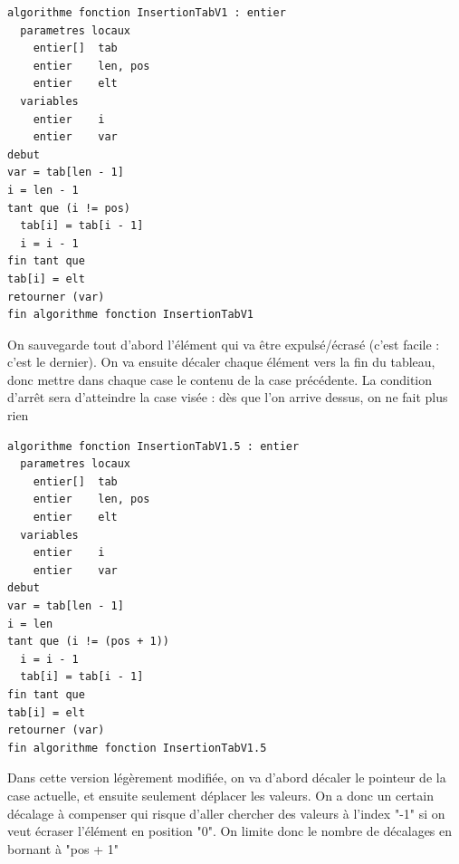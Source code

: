 \documentclass[11pt,a4paper]{article}
\begin{document}
\begin{table}[ht!]
  \centering
\begin{lstlisting}[style=algorithmique]
algorithme fonction InsertionTabV1 : entier
  parametres locaux
    entier[]  tab
    entier    len, pos
    entier    elt
  variables
    entier    i
    entier    var
debut
var = tab[len - 1]
i = len - 1
tant que (i != pos)
  tab[i] = tab[i - 1]
  i = i - 1
fin tant que
tab[i] = elt
retourner (var)
fin algorithme fonction InsertionTabV1 \end{lstlisting}
  \caption{On sauvegarde tout d'abord l'élément qui va être expulsé/écrasé (c'est facile : c'est le dernier). On va ensuite décaler chaque élément vers la fin du tableau, donc mettre dans chaque case le contenu de la case précédente. La condition d'arrêt sera d'atteindre la case visée : dès que l'on arrive dessus, on ne fait plus rien }
\end{table}

\vfillLast

\newpage

\vfillFirst

\begin{table}[ht!]
  \centering
\begin{lstlisting}[style=algorithmique]
algorithme fonction InsertionTabV1.5 : entier
  parametres locaux
    entier[]  tab
    entier    len, pos
    entier    elt
  variables
    entier    i
    entier    var
debut
var = tab[len - 1]
i = len
tant que (i != (pos + 1))
  i = i - 1
  tab[i] = tab[i - 1]
fin tant que
tab[i] = elt
retourner (var)
fin algorithme fonction InsertionTabV1.5 \end{lstlisting}
  \caption{Dans cette version légèrement modifiée, on va d'abord décaler le pointeur de la case actuelle, et ensuite seulement déplacer les valeurs. On a donc un certain décalage à compenser qui risque d'aller chercher des valeurs à l'index "-1" si on veut écraser l'élément en position "0". On limite donc le nombre de décalages en bornant à "pos + 1" }
\end{table}

\vfillLast

\clearpage

\vfillFirst
\end{document}
